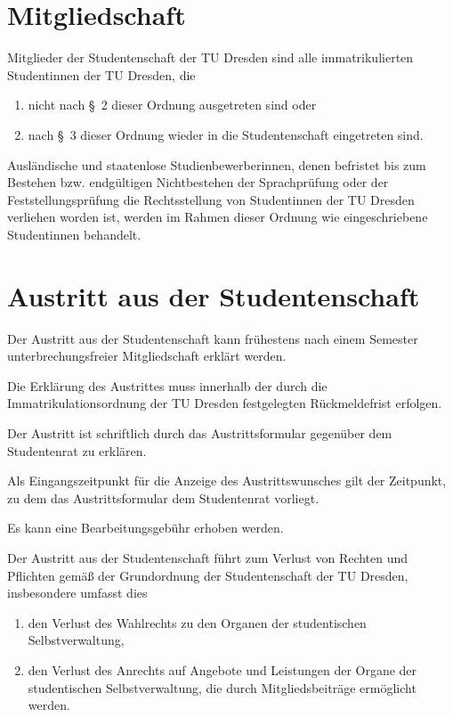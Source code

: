 \setcounter{section}{0}
\begin{multicols}{2}
 

\section{Mitgliedschaft}

\Abs \Satz  Mitglieder der Studentenschaft der TU Dresden sind alle immatrikulierten Studentinnen der TU Dresden, die
\begin{enumerate}
\item nicht nach §~2 dieser Ordnung ausgetreten sind oder
\item nach §~3 dieser Ordnung wieder in die Studentenschaft eingetreten sind.
\end{enumerate}

\Abs \Satz  Ausländische und staatenlose Studienbewerberinnen, denen befristet bis zum Bestehen bzw. endgültigen Nichtbestehen der Sprachprüfung oder der Feststellungsprüfung die Rechtsstellung von Studentinnen der TU Dresden verliehen worden ist, werden im Rahmen dieser Ordnung wie eingeschriebene Studentinnen behandelt.

\section{Austritt aus der Studentenschaft}

\Abs \Satz  Der Austritt aus der Studentenschaft kann frühestens nach einem Semester unterbrechungsfreier Mitgliedschaft erklärt werden.

\Abs \Satz  Die Erklärung des Austrittes muss innerhalb der durch die Immatrikulationsordnung der TU Dresden festgelegten Rückmeldefrist erfolgen.

\Abs \Satz  Der Austritt ist schriftlich durch das Austrittsformular gegenüber dem Studentenrat zu erklären.

\Abs \Satz  Als Eingangszeitpunkt für die Anzeige des Austrittswunsches gilt der Zeitpunkt, zu dem das Austrittsformular dem Studentenrat vorliegt.

\Abs \Satz  Es kann eine Bearbeitungsgebühr erhoben werden.

\Abs \Satz  Der Austritt aus der Studentenschaft führt zum Verlust von Rechten und Pflichten gemäß der Grundordnung der Studentenschaft der TU Dresden, insbesondere umfasst dies
\begin{enumerate}
\item den Verlust des Wahlrechts zu den Organen der studentischen Selbstverwaltung,
\item den Verlust des Anrechts auf Angebote und Leistungen der Organe der studentischen Selbstverwaltung, die durch Mitgliedsbeiträge ermöglicht werden. 
\end{enumerate}


\end{multicols}
